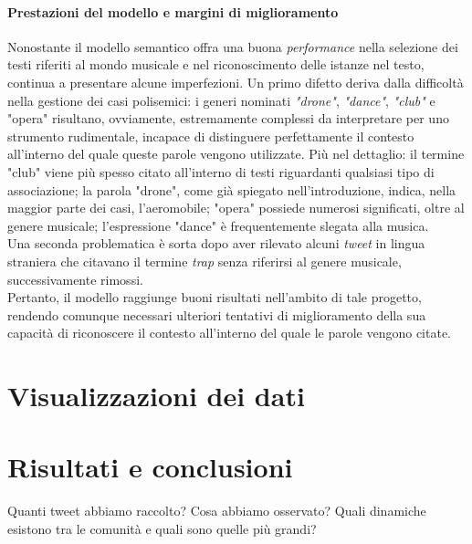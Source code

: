 \documentclass[12pt, a4paper, twocolumn]{article} %
\begin{document}
\subsection{Prestazioni del modello e margini di miglioramento}
Nonostante il modello semantico offra una buona \textit{performance} nella selezione dei testi riferiti al mondo musicale e nel riconoscimento delle istanze nel testo, continua a presentare alcune imperfezioni. Un primo difetto deriva dalla difficoltà nella gestione dei casi polisemici: i generi nominati \textit{"drone"}, \textit{"dance"}, \textit{"club"} e "opera" risultano, ovviamente, estremamente complessi da interpretare per uno strumento rudimentale, incapace di distinguere perfettamente il contesto all'interno del quale queste parole vengono utilizzate. Più nel dettaglio: il termine "club" viene più spesso citato all'interno di testi riguardanti qualsiasi tipo di associazione; la parola "drone", come già spiegato nell'introduzione, indica, nella maggior parte dei casi, l'aeromobile; "opera" possiede numerosi significati, oltre al genere musicale; l'espressione "dance" è frequentemente slegata alla musica. \\
Una seconda problematica è sorta dopo aver rilevato alcuni \textit{tweet} in lingua straniera che citavano il termine \textit{trap} senza riferirsi al genere musicale, successivamente rimossi.\\
Pertanto, il modello raggiunge buoni risultati nell'ambito di tale progetto, rendendo comunque necessari ulteriori tentativi di miglioramento della sua capacità di riconoscere il contesto all'interno del quale le parole vengono citate.

\hfill
\newpage
\part{Visualizzazioni dei dati}

\hfill
\newpage
\part{Risultati e conclusioni}
Quanti tweet abbiamo raccolto? Cosa abbiamo osservato? Quali dinamiche esistono tra le comunità e quali sono quelle più grandi?



\hfill
\newpage
\printbibliography[title={Bibliografia e sitografia}]

\end{document}
